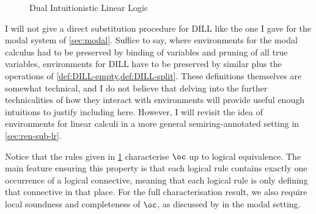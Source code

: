 \begin{figure}
  \caption{Dual Intuitionistic Linear Logic}
  \label{fig:dill}
\end{figure}

I will not give a direct substitution procedure for DILL like the one I gave for
the modal system of \cref{sec:modal}.
Suffice to say, where environments for the modal calculus had to be preserved by
binding of variables and pruning of all true variables, environments for DILL
have to be preserved by similar plus the operations of
\cref{def:DILL-empty,def:DILL-split}.
These definitions themselves are somewhat technical, and I do not believe that
delving into the further technicalities of how they interact with environments
will provide useful enough intuitions to justify including here.
However, I will revisit the idea of environments for linear calculi in a more
general semiring-annotated setting in \cref{sec:ren-sub-lr}.

Notice that the rules given in \cref{fig:dill} characterise $\oc$ up to
logical equivalence.
The main feature ensuring this property is that each logical rule contains
exactly one occurrence of a logical connective, meaning that each logical rule
is only defining that connective in that place.
For the full characterisation result, we also require local soundness and
completeness of $\oc$, as discussed by \citet{judgmental} in the modal setting.

